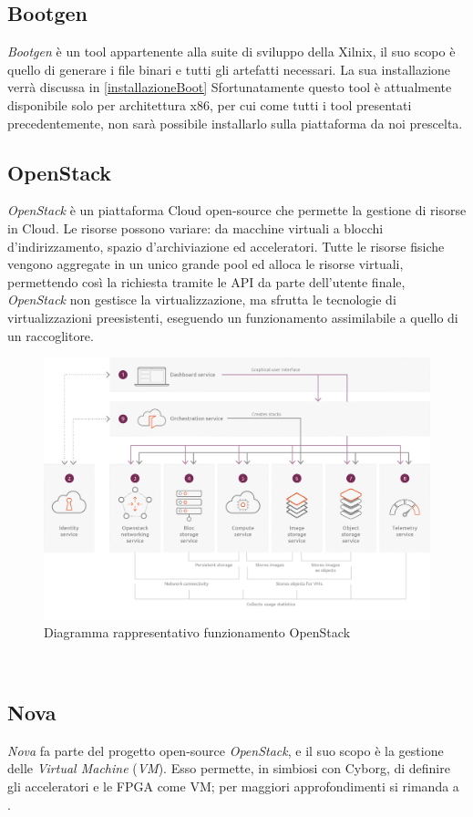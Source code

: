 \subsection{Bootgen}
\textit{Bootgen} è un tool appartenente alla suite di sviluppo della Xilnix, il suo scopo è quello di generare i file binari e tutti gli artefatti necessari. La sua installazione verrà discussa in \ref{installazioneBoot}
Sfortunatamente questo tool è attualmente disponibile solo per architettura x86, per cui come tutti i tool presentati precedentemente, non sarà possibile installarlo sulla piattaforma da noi prescelta.\clearpage
\subsection{OpenStack}
\textit{OpenStack} è un piattaforma Cloud open-source\cite{OpenStack2} che permette la gestione di risorse in Cloud. Le risorse possono variare: da macchine virtuali a blocchi d'indirizzamento, spazio d'archiviazione ed acceleratori. Tutte le risorse fisiche vengono aggregate in un unico grande pool ed alloca le risorse virtuali, permettendo così la richiesta tramite le API da parte dell'utente finale, \textit{OpenStack} non gestisce la virtualizzazione, ma sfrutta le tecnologie di virtualizzazioni preesistenti, eseguendo un funzionamento assimilabile a quello di un raccoglitore.
\begin{figure}[h]
\centering
\includegraphics[width=1\textwidth]{images/Openstack.jpg}
\caption{Diagramma rappresentativo funzionamento OpenStack\cite{OpenStack2}}
\end{figure}\\
\subsection{Nova}
\textit{Nova} fa parte del progetto open-source \textit{OpenStack}, e il suo scopo è la gestione delle \textit{Virtual Machine }(\textit{VM}). Esso permette, in simbiosi con Cyborg, di definire gli acceleratori e le FPGA come VM; per maggiori approfondimenti si rimanda a \cite{Nova}.
